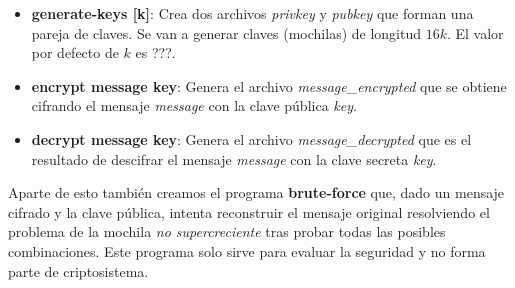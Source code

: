 \documentclass[12pt]{article}
\begin{document}
\begin{itemize}
	\item \textbf{generate-keys [k]}: Crea dos archivos \textit{privkey} y \textit{pubkey} que forman una pareja de claves. Se van a generar claves (mochilas) de longitud $16k$. El valor por defecto de $k$ es ???.
	\item \textbf{encrypt message key}: Genera el archivo \textit{message\_encrypted} que se obtiene cifrando el mensaje \textit{message} con la clave pública \textit{key}.
	\item \textbf{decrypt message key}: Genera el archivo \textit{message\_decrypted} que es el resultado de descifrar el mensaje \textit{message} con la clave secreta \textit{key}.
\end{itemize}
Aparte de esto también creamos el programa \textbf{brute-force} que, dado un mensaje cifrado y la clave pública, intenta reconstruir el mensaje original resolviendo el problema de la mochila \emph{no supercreciente} tras probar todas las posibles combinaciones. Este programa solo sirve para evaluar la seguridad y no forma parte de criptosistema.

 
\end{document}

